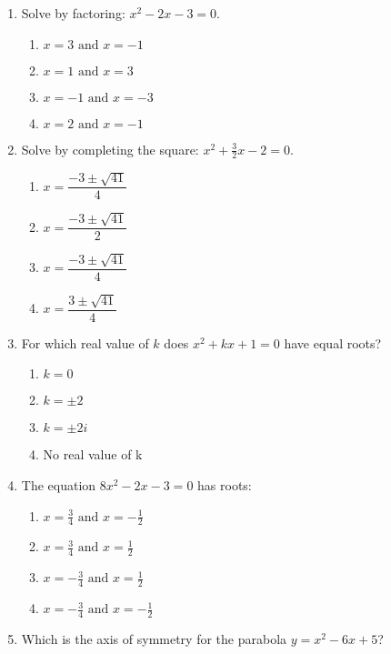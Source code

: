 \documentclass[12pt]{article}
\begin{document}
\begin{enumerate}
\item Solve by factoring: \(x^2 - 2x - 3 = 0\).

\begin{enumerate}
  \item \(x = 3\text{ and }x = -1\)
  \item \(x = 1\text{ and }x = 3\)
  \item \(x = -1\text{ and }x = -3\)
  \item \(x = 2\text{ and }x = -1\)
\end{enumerate}

\item Solve by completing the square: \(x^2 + \tfrac{3}{2}x - 2 = 0\).

\begin{enumerate}
  \item \(x = \dfrac{-3 \pm \sqrt{41}}{4}\)
  \item \(x = \dfrac{-3 \pm \sqrt{41}}{2}\)
  \item \(x = \dfrac{-3 \pm \sqrt{41}}{4}\)
  \item \(x = \dfrac{3 \pm \sqrt{41}}{4}\)
\end{enumerate}

\item For which real value of \(k\) does \(x^2 + kx + 1 = 0\) have equal roots?

\begin{enumerate}
  \item \(k = 0\)
  \item \(k = \pm 2\)
  \item \(k = \pm 2i\)
  \item No real value of k
\end{enumerate}

\item The equation \(8x^2 - 2x - 3 = 0\) has roots:

\begin{enumerate}
  \item \(x = \tfrac{3}{4}\text{ and }x = -\tfrac{1}{2}\)
  \item \(x = \tfrac{3}{4}\text{ and }x = \tfrac{1}{2}\)
  \item \(x = -\tfrac{3}{4}\text{ and }x = \tfrac{1}{2}\)
  \item \(x = -\tfrac{3}{4}\text{ and }x = -\tfrac{1}{2}\)
\end{enumerate}

\item Which is the axis of symmetry for the parabola \(y = x^2 - 6x + 5\)?


\end{enumerate}
\end{document}
